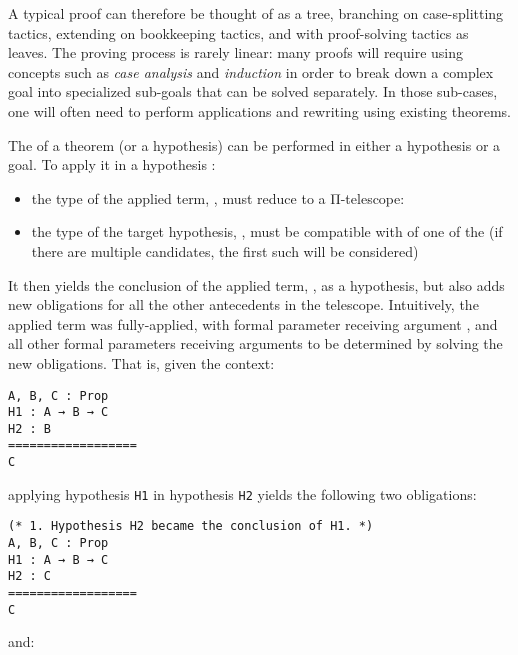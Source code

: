 A typical proof can therefore be thought of as a tree, branching on
case-splitting tactics, extending on bookkeeping tactics, and with proof-solving
tactics as leaves.  The proving process is rarely linear: many proofs will
require using concepts such as \emph{case analysis} and \emph{induction} in
order to break down a complex goal into specialized sub-goals that can be solved
separately.  In those sub-cases, one will often need to perform applications and
rewriting using existing theorems.

The  of a theorem (or a hypothesis)  can be
performed in either a hypothesis or a goal.  To apply it in a hypothesis
:

\begin{itemize}

  \item the type of the applied term, , must reduce to a Π-telescope:


  \item the type of the target hypothesis, , must be compatible
with of one of the  (if there are multiple candidates, the first
such  will be considered)

\end{itemize}

It then yields the conclusion of the applied term, , as a
hypothesis, but also adds new obligations for all the other antecedents in the
telescope.  Intuitively, the applied term  was fully-applied, with
formal parameter  receiving argument , and all other
formal parameters receiving arguments to be determined by solving the new
obligations.  That is, given the context:

\begin{verbatim}
A, B, C : Prop
H1 : A → B → C
H2 : B
==================
C
\end{verbatim}

applying hypothesis \texttt{H1} in hypothesis \texttt{H2}
yields the following two obligations:

\begin{verbatim}
(* 1. Hypothesis H2 became the conclusion of H1. *)
A, B, C : Prop
H1 : A → B → C
H2 : C
==================
C
\end{verbatim}

and:

